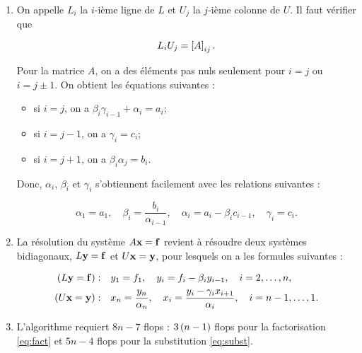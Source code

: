 \begin{enumerate}[label=\alph*)]
  \item On appelle $L_{i}$ la $i$-ième ligne de $L$ et $U_{j}$ la $j$-ième colonne de $U$.
        Il faut vérifier que
        
        \begin{equation*}
          L_{i} U_{j} = \squared{A}_{ij}.
        \end{equation*}
        
        Pour la matrice $A$, on a des éléments pas nuls seulement pour $i = j$ ou $i = j \pm 1$.
        On obtient les équations suivantes :
        
        \begin{itemize}
          \item si $i = j$, on a $\beta_{i} \gamma_{i-1} + \alpha_{i} = a_{i}$;
          \item si $i = j - 1$, on a $\gamma_{i} = c_{i}$;
          \item si $i = j + 1$, on a $\beta_{i} \alpha_{j} = b_{i}$.
        \end{itemize}
        
        Donc, $\alpha_{i}$, $\beta_{i}$ et $\gamma_{i}$ s'obtiennent facilement avec les relations suivantes :
        
        \begin{equation}
        \label{eq:fact}
          \alpha_{1} = a_{1}, \quad 
          \beta_{i} = \dfrac{b_{i}}{\alpha_{i-1}}, \quad 
          \alpha_{i} = a_{i} - \beta_{i} c_{i-1}, \quad 
          \gamma_{i} = c_{i}.
        \end{equation}
        
  \item La résolution du système $A \BoldX = \BoldF$ revient à résoudre deux systèmes bidiagonaux, $L \BoldY = \BoldF$ et $U \BoldX = \BoldY$, pour lesquels on a les formules suivantes :
  
        \begin{equation}
        \label{eq:subst}
          \begin{split}
              \parent{L \BoldY = \BoldF} :  & \quad   y_{1} = f_{1}, \quad y_{i} = f_{i} - \beta_{i} y_{i-1}, \quad i = 2, \dots, n, \\
              \parent{U \BoldX = \BoldY} :  & \quad   x_{n} = \dfrac{y_{n}}{\alpha_{n}}, \quad x_{i} = \dfrac{y_{i} - \gamma_{i} x_{i+1}}{\alpha_{i}}, \quad i = n-1, \dots, 1.
          \end{split}
        \end{equation}
        
  \item L'algorithme requiert $8n - 7$ flops : $3 \parent{n-1}$ flops pour la factorisation \eqref{eq:fact} et $5n - 4$ flops pour la substitution \eqref{eq:subst}.
        
        
        
        
\end{enumerate}